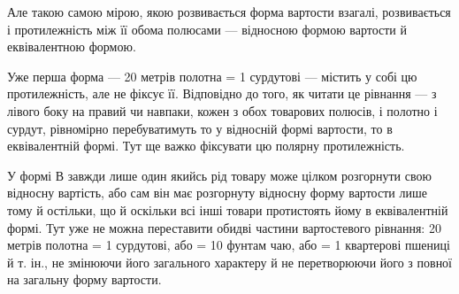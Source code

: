 Але такою самою мірою, якою розвивається форма вартости
взагалі, розвивається і протилежність між її обома полюсами —
відносною формою вартости й еквівалентною формою.

Уже перша форма — 20 метрів полотна = 1 сурдутові —
містить у собі цю протилежність, але не фіксує її. Відповідно до
того, як читати це рівнання — з лівого боку на правий чи навпаки,
кожен з обох товарових полюсів, і полотно і сурдут, рівномірно
перебуватимуть то у відносній формі вартости, то в еквівалентній
формі. Тут ще важко фіксувати цю полярну протилежність.

У формі В завжди лише один якийсь рід товару може цілком
розгорнути свою відносну вартість, або сам він має розгорнуту
відносну форму вартости лише тому й остільки, що й оскільки
всі інші товари протистоять йому в еквівалентній формі. Тут уже
не можна переставити обидві частини вартостевого рівнання: 20 метрів
полотна = 1 сурдутові, або = 10 фунтам чаю, або = 1 квартерові
пшениці й т. ін., не змінюючи його загального характеру
й не перетворюючи його з повної на загальну форму вартости.

